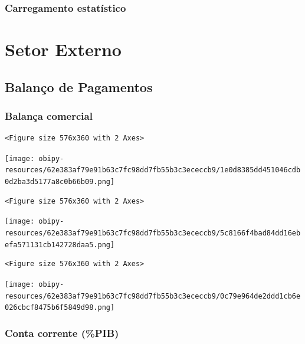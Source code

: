 \documentclass[11pt]{article}
\begin{document}
\subsubsection{Carregamento estatístico}
\label{sec:org7615b3c}


\section{Setor Externo}
\label{sec:org52219d2}


\subsection{Balanço de Pagamentos}
\label{sec:org06a4c16}



\subsubsection{Balança comercial}
\label{sec:org7a8c758}

\begin{verbatim}
<Figure size 576x360 with 2 Axes>
\end{verbatim}


\begin{center}
\texttt{[image: obipy-resources/62e383af79e91b63c7fc98dd7fb55b3c3ececcb9/1e0d8385dd451046cdb0d2ba3d5177a8c0b66b09.png]}
\end{center}


\begin{verbatim}
<Figure size 576x360 with 2 Axes>
\end{verbatim}


\begin{center}
\texttt{[image: obipy-resources/62e383af79e91b63c7fc98dd7fb55b3c3ececcb9/5c8166f4bad84dd16ebefa571131cb142728daa5.png]}
\end{center}


\begin{verbatim}
<Figure size 576x360 with 2 Axes>
\end{verbatim}


\begin{center}
\texttt{[image: obipy-resources/62e383af79e91b63c7fc98dd7fb55b3c3ececcb9/0c79e964de2ddd1cb6e026cbcf8475b6f5849d98.png]}
\end{center}


\subsubsection{Conta corrente (\%PIB)}
\label{sec:orga05351c}
\end{document}
